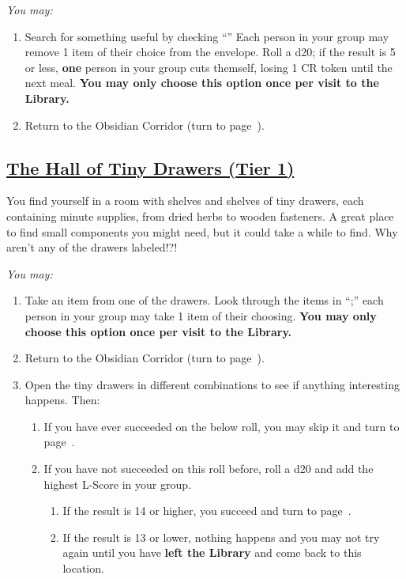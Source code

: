 \documentclass[sheet]{GL2020}
\begin{document}
\vspace{0.5cm}

\begingroup
\itshape
You may:
\begin{enumerate}[A]
  \item Search for something useful by checking ``\sObsidianGreenhouseEnvelope{}'' Each person in your group may remove 1 item of their choice from the envelope. Roll a d20; if the result is 5 or less, \textbf{one} person in your group cuts themself, losing 1 CR token until the next meal. \textbf{You may only choose this option once per visit to the Library.}
	\item Return to the Obsidian Corridor (turn to page~\pageref{ObsidianCorridor}).
\end{enumerate}
\endgroup

\clearpage

\begin{center}\section*{\underline{The Hall of Tiny Drawers (Tier 1)}}\end{center}
\label{HallofTinyDrawers}

You find yourself in a room with shelves and shelves of tiny drawers, each containing minute supplies, from dried herbs to wooden fasteners. A great place to find small components you might need, but it could take a while to find. Why aren't any of the drawers labeled!?!

\vspace{0.5cm}

\begingroup
\itshape
You may:
\begin{enumerate}[A]
  \item Take an item from one of the drawers. Look through the items in ``\sHallOfDrawersEnvelope{};'' each person in your group may take 1 item of their choosing. \textbf{You may only choose this option once per visit to the Library.}
	\item Return to the Obsidian Corridor (turn to page~\pageref{ObsidianCorridor}).
	\item Open the tiny drawers in different combinations to see if anything interesting happens. Then:
	\begin{enumerate}
		\item If you have ever succeeded on the below roll, you may skip it and turn to page~\pageref{SecretPassage}.
		\item If you have not succeeded on this roll before, roll a d20 and add the highest L-Score in your group.
		\begin{enumerate}
			\item If the result is 14 or higher, you succeed and turn to page~\pageref{SecretPassage}.
			\item If the result is 13 or lower, nothing happens and you may not try again until you have \textbf{left the Library} and come back to this location.
		\end{enumerate}
	\end{enumerate}
\end{enumerate}
\endgroup
\end{document}
